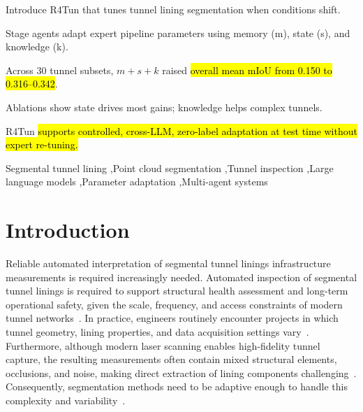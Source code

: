 \documentclass[a4paper,fleqn]{cas-dc}
\newcommand{\hlcite}[1]{\hl{\cite{#1}}}
\begin{document}
{%

\begin{highlights}
\item Introduce R4Tun that tunes tunnel lining segmentation when conditions shift.
\item Stage agents adapt expert pipeline parameters using memory (m), state (s), and knowledge (k).
\item Across 30 tunnel subsets, \mbox{$m+s+k$} raised \hl{overall mean mIoU from 0.150 to 0.316--0.342}.
\item Ablations show state drives most gains; knowledge helps complex tunnels.
\item R4Tun \hl{supports controlled, cross-LLM, zero-label adaptation at test time without expert re-tuning.}
\end
{highlights}


\begin{keywords}
Segmental tunnel lining \sep Point cloud segmentation \sep Tunnel inspection \sep Large language models \sep Parameter adaptation \sep Multi-agent systems
\end{keywords}
\date{\today}

\maketitle

\smallskip

\section{Introduction}\label{sec:intro}

Reliable automated interpretation of segmental tunnel linings infrastructure measurements is required increasingly needed.
Automated inspection of segmental tunnel linings is required to support structural health assessment and long-term operational safety, given the scale, frequency, and access constraints of modern tunnel networks~\hlcite{attard2018,yue2024automatic,yue2024damage}. In practice, engineers routinely encounter projects in which tunnel geometry, lining properties, and data acquisition settings vary~\cite{weidner2024generalized}. Furthermore, although modern laser scanning enables high-fidelity tunnel capture, the resulting measurements often contain mixed structural elements, occlusions, and noise, making direct extraction of lining components challenging~\cite{huang2021bim,sjolander2023towards}. Consequently, segmentation methods need to be adaptive enough to handle this complexity and variability~\cite{montero2015, strauss2020sensing}.

}
\end{document}
